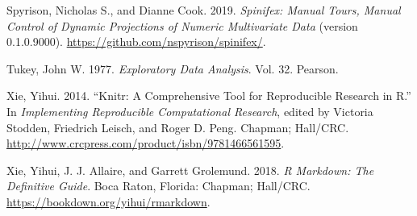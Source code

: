 \documentclass[
]{article}
\begin{document}
\leavevmode\hypertarget{ref-spyrison_spinifex_2019}{}%
Spyrison, Nicholas S., and Dianne Cook. 2019. \emph{Spinifex: Manual
Tours, Manual Control of Dynamic Projections of Numeric Multivariate
Data} (version 0.1.0.9000).
\url{https://github.com/nspyrison/spinifex/}.

\leavevmode\hypertarget{ref-tukey_exploratory_1977}{}%
Tukey, John W. 1977. \emph{Exploratory Data Analysis}. Vol. 32. Pearson.

\leavevmode\hypertarget{ref-stodden_knitr:_2014}{}%
Xie, Yihui. 2014. ``Knitr: A Comprehensive Tool for Reproducible
Research in R.'' In \emph{Implementing Reproducible Computational
Research}, edited by Victoria Stodden, Friedrich Leisch, and Roger D.
Peng. Chapman; Hall/CRC.
\url{http://www.crcpress.com/product/isbn/9781466561595}.

\leavevmode\hypertarget{ref-xie_r_2018}{}%
Xie, Yihui, J. J. Allaire, and Garrett Grolemund. 2018. \emph{R
Markdown: The Definitive Guide}. Boca Raton, Florida: Chapman; Hall/CRC.
\url{https://bookdown.org/yihui/rmarkdown}.
\end{document}
